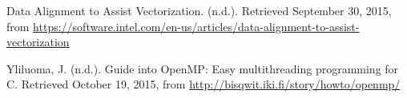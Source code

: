 \documentclass[11pt]{article}
\begin{document}
\begin{thebibliography}{9}
Data Alignment to Assist Vectorization. (n.d.). Retrieved September 30, 2015, from \url{https://software.intel.com/en-us/articles/data-alignment-to-assist-vectorization}

Yliluoma, J. (n.d.). Guide into OpenMP: Easy multithreading programming for C. Retrieved October 19, 2015, from \url{http://bisqwit.iki.fi/story/howto/openmp/}

\end{thebibliography}

 
 
\end{document}
